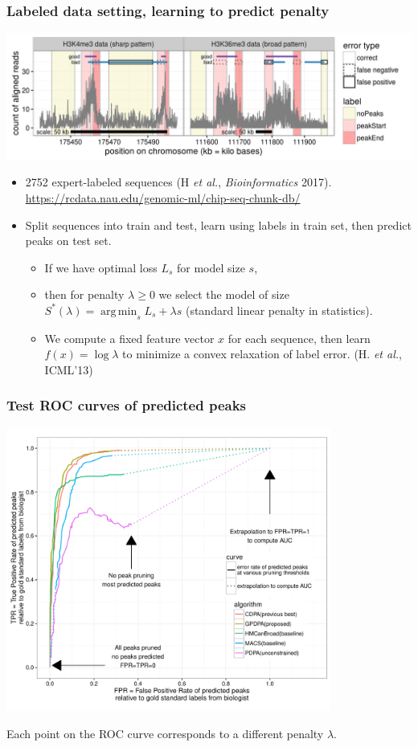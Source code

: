\documentclass[t]{beamer}
\DeclareMathOperator*{\argmin}{arg\,min}
\begin{document}
\begin{frame}
  \frametitle{Labeled data setting, learning to predict penalty}

  \includegraphics[width=\textwidth]{figure-good-bad}

  \begin{itemize}
  \item 2752 expert-labeled sequences (H {\it et al.}, {\it Bioinformatics} 2017). 
    {\small \url{https://rcdata.nau.edu/genomic-ml/chip-seq-chunk-db/}}
  \item Split sequences into train and test, learn using labels in
    train set, then predict peaks on test set.
    \begin{itemize}
    \item  If we have optimal loss $L_s$ for model size $s$,
    \item then for penalty $\lambda\geq 0$ we select the model of size $ S^*(\lambda) = \argmin_s L_s + \lambda s $ (standard linear penalty in statistics).
    \item We compute a fixed feature vector $x$ for each sequence,
      then learn $f(x)=\log \lambda$ to minimize a convex relaxation of label
      error. (H. \emph{et al.}, ICML'13)
    \end{itemize}
\end{itemize}

\end{frame}

\begin{frame}
  \frametitle{Test ROC curves of predicted peaks}
  \includegraphics[width=0.8\textwidth]{figure-test-error-dots-ROC-supp.pdf}

  Each point on the ROC curve corresponds to a different penalty $\lambda$.
\end{frame}
\end{document}
